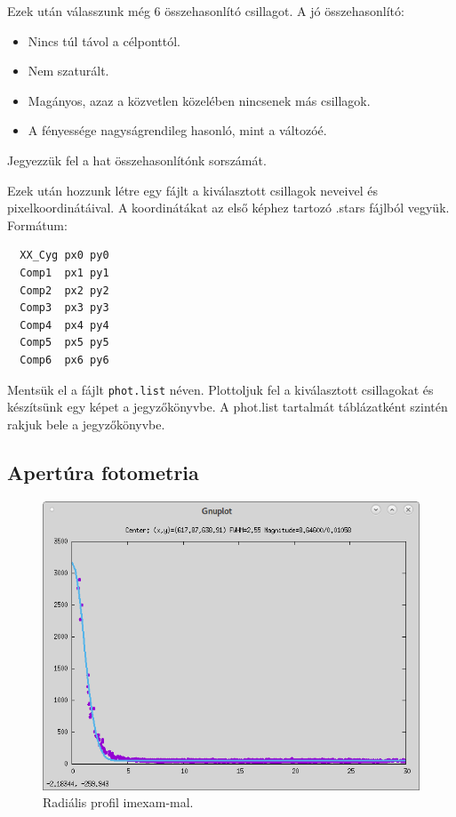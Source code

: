 \documentclass{article}
\begin{document}
Ezek után válasszunk még 6 összehasonlító csillagot.
A jó összehasonlító:
\begin{itemize}
  \item Nincs túl távol a célponttól.
  \item Nem szaturált.
  \item Magányos, azaz a közvetlen közelében nincsenek más csillagok.
  \item A fényessége nagyságrendileg hasonló, mint a változóé.
\end{itemize}

Jegyezzük fel a hat összehasonlítónk sorszámát.

Ezek után hozzunk létre egy fájlt a kiválasztott csillagok neveivel és
pixelkoordinátáival. A koordinátákat az első képhez tartozó .stars fájlból
vegyük. Formátum:

\begin{verbatim}
  XX_Cyg px0 py0
  Comp1  px1 py1
  Comp2  px2 py2
  Comp3  px3 py3
  Comp4  px4 py4
  Comp5  px5 py5
  Comp6  px6 py6
\end{verbatim}

Mentsük el a fájlt \verb+phot.list+ néven. Plottoljuk fel a kiválasztott csillagokat
és készítsünk egy képet a jegyzőkönyvbe. A phot.list tartalmát táblázatként
szintén rakjuk bele a jegyzőkönyvbe.

\subsection{Apertúra fotometria}


\begin{figure}[ht!]
    \centering
    \includegraphics[width=0.7\linewidth]{pics/radialprofil.png}
    \caption{Radiális profil imexam-mal.}
    \label{radialp}
\end{figure}
\end{document}

